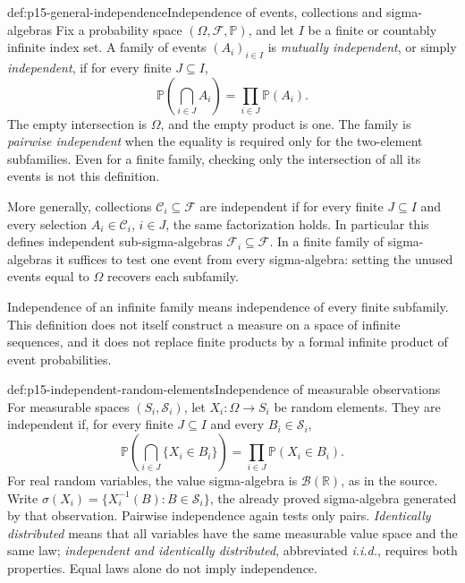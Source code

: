 \begin{hbdefinition}{def:p15-general-independence}{Independence of events, collections and sigma-algebras}
Fix a probability space \((\Omega,\mathcal F,\mathbb P)\), and let
\(I\) be a finite or countably infinite index set. A family of events
\((A_i)_{i\in I}\) is \emph{mutually independent}, or simply
\emph{independent}, if for every finite \(J\subseteq I\),
\[
 \mathbb P\left(\bigcap_{i\in J}A_i\right)
                         =\prod_{i\in J}\mathbb P(A_i).
\]
The empty intersection is \(\Omega\), and the empty product is one.
The family is \emph{pairwise independent} when the equality is required
only for the two-element subfamilies. Even for a finite family, checking
only the intersection of all its events is not this definition.

More generally, collections \(\mathcal C_i\subseteq\mathcal F\)
are independent if for every finite \(J\subseteq I\) and every
selection \(A_i\in\mathcal C_i\), \(i\in J\), the same factorization
holds. In particular this defines independent sub-sigma-algebras
\(\mathcal F_i\subseteq\mathcal F\). In a finite family of
sigma-algebras it suffices to test one event from every sigma-algebra:
setting the unused events equal to \(\Omega\) recovers each subfamily.

Independence of an infinite family means independence of every finite
subfamily. This definition does not itself construct a measure on a
space of infinite sequences, and it does not replace finite products
by a formal infinite product of event probabilities.
\end{hbdefinition}

\begin{hbdefinition}{def:p15-independent-random-elements}{Independence of measurable observations}
For measurable spaces \((S_i,\mathcal S_i)\), let
\(X_i:\Omega\to S_i\) be random elements. They are independent
if, for every finite \(J\subseteq I\) and every \(B_i\in\mathcal S_i\),
\[
 \mathbb P\left(\bigcap_{i\in J}\{X_i\in B_i\}\right)
                      =\prod_{i\in J}\mathbb P(X_i\in B_i).
\]
For real random variables, the value sigma-algebra is
\(\mathcal B(\mathbb R)\), as in the source. Write
\(\sigma(X_i)=\{X_i^{-1}(B):B\in\mathcal S_i\}\), the already
proved sigma-algebra generated by that observation. Pairwise independence
again tests only pairs. \emph{Identically distributed} means that all
variables have the same measurable value space and the same law;
\emph{independent and identically distributed}, abbreviated \emph{i.i.d.},
requires both properties. Equal laws alone do not imply independence.
\end{hbdefinition}


